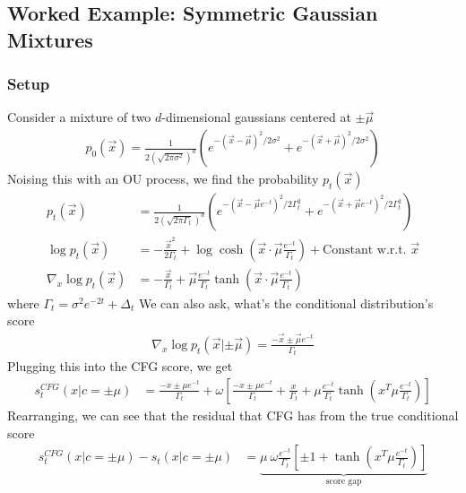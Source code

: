 \documentclass[12pt,fleqn]{article}
\numberwithin{equation}{section} %
\begin{document}
\subsection{Worked Example: Symmetric Gaussian Mixtures}
\subsubsection{Setup}
Consider a mixture of two $d$-dimensional gaussians centered at $\pm \vec \mu$
\begin{align}
	p_0(\vec x) = \frac{1}{2(\sqrt{2 \pi \sigma^2})^d} \left ( e^{-(\vec x - \vec \mu)^2 / 2 \sigma^2} + e^{-(\vec x + \vec \mu)^2  / 2\sigma^2} \right)
\end{align}
Noising this with an OU process, we find the probability $p_t(\vec x)$
\begin{align}
	p_t(\vec x) & = \frac{1}{2(\sqrt{2\pi \Gamma_t})^d}  \left ( e^{-(\vec x - \vec \mu e^{-t})^2 / 2 \Gamma_t^2} + e^{-(\vec x + \vec \mu e^{-t})^2  / 2\Gamma_t^2} \right)\\
	\log p_t(\vec x) & = - \frac{\vec x^2}{2 \Gamma_t} + \log \cosh \left (\vec x \cdot \vec \mu \frac{e^{-t}}{\Gamma_t} \right) + \text{Constant w.r.t. } \vec x\\
	\nabla_x \log p_t(\vec x)& = - \frac{\vec x}{\Gamma_t} + \vec \mu \frac{e^{-t}}{\Gamma_t} \tanh\left(\vec x \cdot \vec \mu \frac{e^{-t}}{\Gamma_t} \right)
\end{align}
where $\Gamma_t = \sigma^2 e^{-2t} + \Delta_t$
We can also ask, what's the conditional distribution's score
\begin{align}
	\nabla_x \log p_t(\vec x | \pm\vec \mu)  = \frac{-\vec x \pm \vec \mu e^{-t}}{\Gamma_t}
\end{align}
Plugging this into the CFG score, we get
\begin{align}
	s_t^{CFG}(x|c=  \pm \mu )& = \frac{-x \pm \mu e^{-t}}{\Gamma_t} + \omega [\frac{-x \pm \mu e^{-t}}{\Gamma_t}+ \frac{x}{\Gamma_t} + \mu \frac{e^{-t}}{\Gamma_t} \tanh(x^T \mu \frac{e^{-t}}{\Gamma_t} )]
\end{align}
Rearranging, we can see that the residual that CFG has from the true conditional score
\begin{align}
	s_t^{CFG}(x |c = \pm \mu) - s_t(x|c = \pm \mu) & = \underbrace{\mu ~ \omega \frac{e^{-t}}{\Gamma_t}  [\pm 1 +  \tanh(x^T \mu \frac{e^{-t}}{\Gamma_t} )]}_{\text{score gap}}
\end{align}
\end{document}
